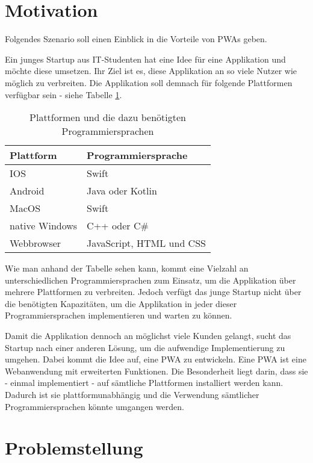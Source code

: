 
\section{Motivation} \label{se:Motivation}

Folgendes Szenario soll einen Einblick in die Vorteile von \ac{PWAs} geben. 

Ein junges Startup aus IT-Studenten hat eine Idee für eine Applikation und möchte diese umsetzen. Ihr Ziel ist es, diese Applikation an so viele Nutzer wie möglich zu verbreiten. Die Applikation soll demnach für folgende Plattformen verfügbar sein - siehe Tabelle \ref{plattformen}.

\begin{table}[!htb]
\begin{tabularx}{\textwidth}{|X|X|}
    \hline
    \textbf{Plattform} & \textbf{Programmiersprache} \\
    \hline
    \hline
    IOS & Swift \\
    \hline
    Android & Java oder Kotlin\\
    \hline
    MacOS & Swift \\
    \hline 
    native Windows & C++ oder C\# \\
    \hline
    Webbrowser & JavaScript, HTML und CSS \\
    \hline
\end{tabularx}
\caption{Plattformen und die dazu benötigten Programmiersprachen}
\label{plattformen}
\end{table}

Wie man anhand der Tabelle sehen kann, kommt eine Vielzahl an unterschiedlichen Programmiersprachen zum Einsatz, um die Applikation über mehrere Plattformen zu verbreiten. Jedoch verfügt das junge Startup nicht über die benötigten Kapazitäten, um die Applikation in jeder dieser Programmiersprachen implementieren und warten zu können. 

Damit die Applikation dennoch an möglichst viele Kunden gelangt, sucht das Startup nach einer anderen Lösung, um die aufwendige Implementierung zu umgehen. Dabei kommt die Idee auf, eine \ac{PWA} zu entwickeln. Eine PWA ist eine Webanwendung mit erweiterten Funktionen. Die Besonderheit liegt darin, dass sie - einmal implementiert - auf sämtliche Plattformen installiert werden kann. Dadurch ist sie plattformunabhängig und die Verwendung sämtlicher Programmiersprachen könnte umgangen werden.


\section{Problemstellung}\label{Problemstellung}

